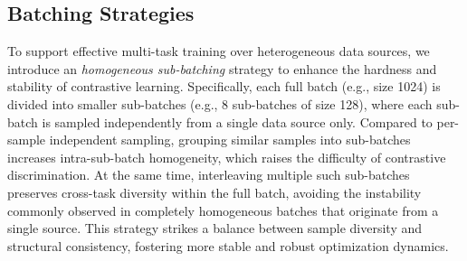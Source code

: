 









\subsection{Batching Strategies}

To support effective multi-task training over heterogeneous data sources, we introduce an \textit{homogeneous sub-batching} strategy to enhance the hardness and stability of contrastive learning. Specifically, each full batch (e.g., size 1024) is divided into smaller sub-batches (e.g., 8 sub-batches of size 128), where each sub-batch is sampled independently from a single data source only. Compared to per-sample independent sampling, grouping similar samples into sub-batches increases intra-sub-batch homogeneity, which raises the difficulty of contrastive discrimination. At the same time, interleaving multiple such sub-batches preserves cross-task diversity within the full batch, avoiding the instability commonly observed in completely homogeneous batches that originate from a single source. This strategy strikes a balance between sample diversity and structural consistency, fostering more stable and robust optimization dynamics.